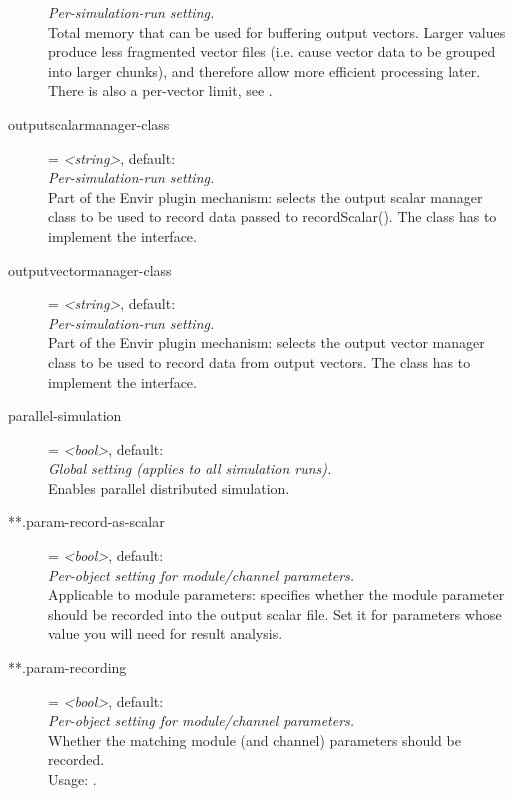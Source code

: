 \begin{description}
    \textit{Per-simulation-run setting.}\\
    Total memory that can be used for buffering output vectors. Larger values
    produce less fragmented vector files (i.e. cause vector data to be grouped
    into larger chunks), and therefore allow more efficient processing later.
    There is also a per-vector limit, see
    .
\item[outputscalarmanager-class] = \textit{<string>}, default: \\
    \textit{Per-simulation-run setting.}\\
    Part of the Envir plugin mechanism: selects the output scalar manager class
    to be used to record data passed to recordScalar(). The class has to
    implement the  interface.
\item[outputvectormanager-class] = \textit{<string>}, default: \\
    \textit{Per-simulation-run setting.}\\
    Part of the Envir plugin mechanism: selects the output vector manager class
    to be used to record data from output vectors. The class has to implement
    the  interface.
\item[parallel-simulation] = \textit{<bool>}, default: \\
    \textit{Global setting (applies to all simulation runs).}\\
    Enables parallel distributed simulation.
\item[**.param-record-as-scalar] = \textit{<bool>}, default: \\
    \textit{Per-object setting for module/channel parameters.}\\
    Applicable to module parameters: specifies whether the module parameter
    should be recorded into the output scalar file. Set it for parameters whose
    value you will need for result analysis.
\item[**.param-recording] = \textit{<bool>}, default: \\
    \textit{Per-object setting for module/channel parameters.}\\
    Whether the matching module (and channel) parameters should be recorded.\\
    Usage:
    .\\

\end{description}
